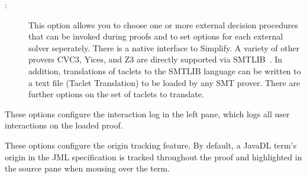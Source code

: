 \begin{description}
\begin{description}
  \item[:] This option allows you to choose
    one or more external decision procedures that can be invoked during
    proofs and to set options for each external solver seperately. 
    There is a native interface to 
    \textsf{Simplify}. A variety of other provers
    \textsf{CVC3},  \textsf{Yices}, and \textsf{Z3}
    are directly supported via SMTLIB~\cite{RanTin-SMTLIB}. 
    In addition, translations of taclets to the SMTLIB language
    can be written to a text file (\textsf{Taclet
      Translation}) to be loaded by any SMT prover. 
    There are further options on the set of taclets to translate.
  \end{description}
  
  \item[\mea{Interaction Logging}:] These options configure the interaction log in the left pane, which logs all user interactions on the loaded proof.
  
  \item[\mea{Origin Tracking}:] These options configure the origin tracking feature. By default, a JavaDL term's origin in the JML specification is tracked throughout the proof and highlighted in the source pane when mousing over the term.
  

\end{description}
